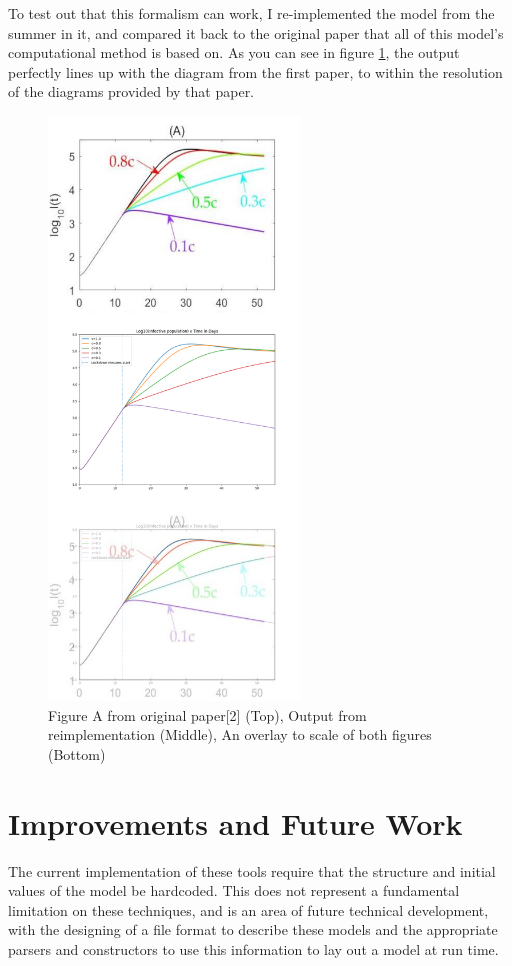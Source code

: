 \documentclass[twocolumn]{article}
\begin{document}
To test out that this formalism can work, I re-implemented the model from the summer in it, and compared it back to the original paper that all of this model's computational method is based on. As you can see in figure \ref{fig:overlay}, the output perfectly lines up with the diagram from the first paper, to within the resolution of the diagrams provided by that paper.

\begin{figure}[!ht]
	\begin{center}
		\includegraphics[width=18em]{figure_a_overlay.png}
		\caption{Figure A from original paper[2] (Top), Output from reimplementation (Middle), An overlay to scale of both figures (Bottom)}
		\label{fig:overlay}
	\end{center}
\end{figure}


\FloatBarrier
\section{Improvements and Future Work}

The current implementation of these tools require that the structure and initial values of the model be hardcoded. This does not represent a fundamental limitation on these techniques, and is an area of future technical development, with the designing of a file format to describe these models and the appropriate parsers and constructors to use this information to lay out a model at run time. 
\end{document}
